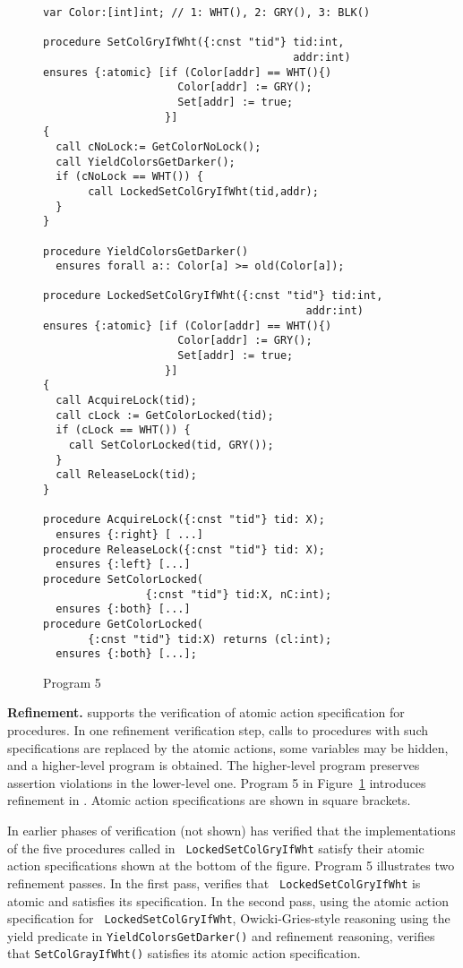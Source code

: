 \begin{figure}
\begin{verbatim}
var Color:[int]int; // 1: WHT(), 2: GRY(), 3: BLK()

procedure SetColGryIfWht({:cnst "tid"} tid:int,
                                       addr:int)
ensures {:atomic} [if (Color[addr] == WHT(){)
                     Color[addr] := GRY();
                     Set[addr] := true;
                   }]
{
  call cNoLock:= GetColorNoLock();
  call YieldColorsGetDarker();
  if (cNoLock == WHT()) {
       call LockedSetColGryIfWht(tid,addr);
  }
}

procedure YieldColorsGetDarker()
  ensures forall a:: Color[a] >= old(Color[a]);

procedure LockedSetColGryIfWht({:cnst "tid"} tid:int,
                                         addr:int)
ensures {:atomic} [if (Color[addr] == WHT(){)
                     Color[addr] := GRY();
                     Set[addr] := true;
                   }]
{
  call AcquireLock(tid);
  call cLock := GetColorLocked(tid);
  if (cLock == WHT()) {
    call SetColorLocked(tid, GRY());
  } 
  call ReleaseLock(tid);
}

procedure AcquireLock({:cnst "tid"} tid: X);
  ensures {:right} [ ...]
procedure ReleaseLock({:cnst "tid"} tid: X);
  ensures {:left} [...]
procedure SetColorLocked(
                {:cnst "tid"} tid:X, nC:int); 
  ensures {:both} [...]
procedure GetColorLocked(
       {:cnst "tid"} tid:X) returns (cl:int);
  ensures {:both} [...];

\end{verbatim}
\caption{Program 5}
\label{fig:reft}
\end{figure}

{\bf Refinement.} 
\civl supports the verification of atomic action specification for
procedures. In one refinement verification step, calls to procedures with such
specifications are replaced by the atomic actions, some variables may
be hidden, and a higher-level program is obtained. The higher-level
program preserves assertion violations in the lower-level one. 
Program 5 in Figure~\ref{fig:reft} introduces refinement in \civl. 
Atomic action specifications are shown in square brackets. 

In earlier phases of verification (not shown) \civl has verified that
the implementations of the five procedures called in {\tt
  LockedSetColGryIfWht} satisfy their atomic action specifications shown
at the bottom of the figure. Program 5 illustrates two \civl
refinement passes. In the first pass, \civl verifies that {\tt
  LockedSetColGryIfWht} is atomic and satisfies its specification. In
the second pass, using the atomic action specification for {\tt
  LockedSetColGryIfWht}, Owicki-Gries-style reasoning using the yield
predicate in {\tt YieldColorsGetDarker()} and refinement reasoning,
\civl verifies that {\tt SetColGrayIfWht()} satisfies its atomic
action specification.

